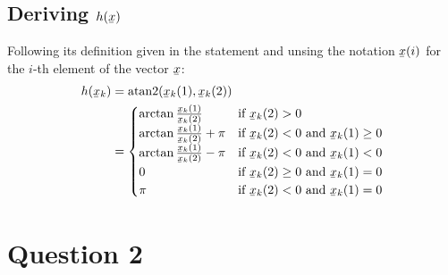 \documentclass[english,DIV=13]{scrartcl}
\newcommand{\ubar}[1]{\underaccent{\bar}{#1}}
\newcommand{\uvec}[1]{\ubar{#1}}
\begin{document}
\subsection*{Deriving $h(\ubar{x})$}
Following its definition given in the statement and unsing the notation $\uvec{x}(i)$
for the $i$-th element of the vector $\uvec{x}$:
\begin{align*}
    h(\uvec{x}_k) &= \text{atan2}(\uvec{x}_k(1), \uvec{x}_k(2)) \\
    &= \begin{cases}
        \arctan\frac{\uvec{x}_k(1)}{\uvec{x}_k(2)} & \text{if $\uvec{x}_k(2) > 0$} \\
        \arctan\frac{\uvec{x}_k(1)}{\uvec{x}_k(2)}+\pi & \text{if $\uvec{x}_k(2) < 0$ and $\uvec{x}_k(1) \geq 0$} \\
        \arctan\frac{\uvec{x}_k(1)}{\uvec{x}_k(2)}-\pi & \text{if $\uvec{x}_k(2) < 0$ and $\uvec{x}_k(1) < 0$} \\
        0 & \text{if $\uvec{x}_k(2) \geq 0$ and $\uvec{x}_k(1) = 0$} \\
        \pi & \text{if $\uvec{x}_k(2) < 0$ and $\uvec{x}_k(1) = 0$}
    \end{cases}
\end{align*}


\section*{Question 2}
\end{document}
